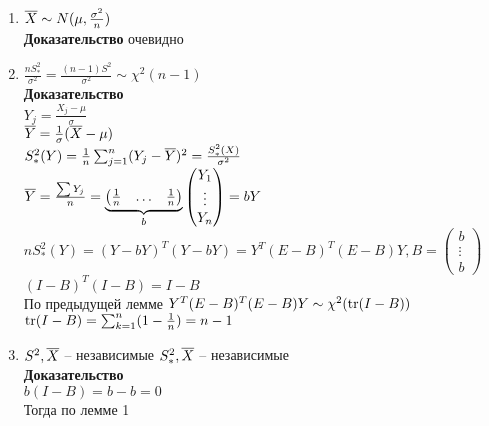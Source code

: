 \documentclass[12pt]{article}
\begin{document}
\begin{enumerate}
	\item $\ol X \sim N(\mu, \frac{\sigma^2}{n})$\\
	\textbf{Доказательство} очевидно
	\item $\frac{nS^2_*}{\sigma^2} = \frac{(n-1)S^2}{\sigma^2} \sim \chi^2 (n-1)$\\
	\textbf{Доказательство}\\
	$Y_j = \frac{X_j - \mu}{\sigma}$\\
	$\ol Y = \frac1\sigma (\ol X - \mu)$\\
	$S_*^2(Y) = \frac1n \sum_{j=1}^n (Y_j - \ol Y)^2 = \frac{S_*^2 (X)}{\sigma^2}$\\
	$\ol Y = \frac{\sum Y_j}{n} = \ub b{\begin{pmatrix}
		\frac{1}{n} & \ldots & \frac{1}{n}
	\end{pmatrix}} \begin{pmatrix}
		Y_1 \\
		\vdots\\
		Y_n
	\end{pmatrix} = bY$\\
	$n S_*^2 (Y) = (Y-bY)^T (Y-bY) = Y^T (E-B)^T(E-B)Y, B = \begin{pmatrix}
		b \\ \vdots \\ b
	\end{pmatrix}$\\
	$(I-B)^T(I-B) = I - B$\\
	По предыдущей лемме $Y^T (E-B)^T(E-B)Y \sim \chi^2(\tr (I-B))$\\
	$\tr (I-B) = \sum_{k=1}^n (1-\frac1n) = n - 1$
	\item $S^2, \ol X $ -- независимые
	$S^2_*, \ol X$ -- независимые\\
	\textbf{Доказательство}\\
	$b(I - B) = b - b = 0$\\
	Тогда по лемме 1
\end{enumerate}
\end{document}
